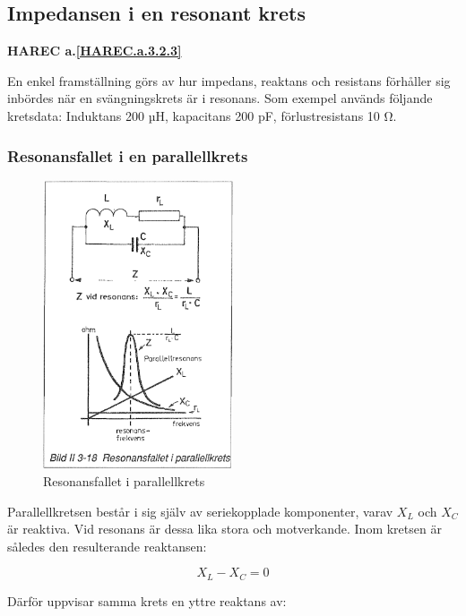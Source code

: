 \subsection{Impedansen i en resonant krets}
\textbf{HAREC a.\ref{HAREC.a.3.2.3}\label{myHAREC.a.3.2.3}}

En enkel framställning görs av hur impedans, reaktans och resistans förhåller
sig inbördes när en svängningskrets är i resonans. Som exempel används följande
kretsdata: Induktans 200 µH, kapacitans 200 pF, förlustresistans 10 Ω.

\subsubsection{Resonansfallet i en parallellkrets}
\label{parallellresonans}

\begin{figure}
\includegraphics[width=0.5\textwidth]{images/bild_2_3-18}
\caption{Resonansfallet i parallellkrets}
\label{fig:BildII3-18}
\end{figure}

Parallellkretsen består i sig själv av seriekopplade komponenter, varav
\(X_L\) och \(X_C\) är reaktiva. Vid resonans är dessa lika stora och
motverkande. Inom kretsen är således den resulterande reaktansen:

\[X_L - X_C = 0\]

Därför uppvisar samma krets en yttre reaktans av:

